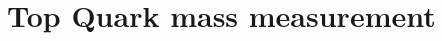 \chapter{Top Quark mass measurement}
\ifpdf
    \graphicspath{{05_Mass_analysis/plots/}}
\else
    \graphicspath{{05_Mass_analysis/plots/EPS/}{05_Mass_analysis/plots/}}
\fi



